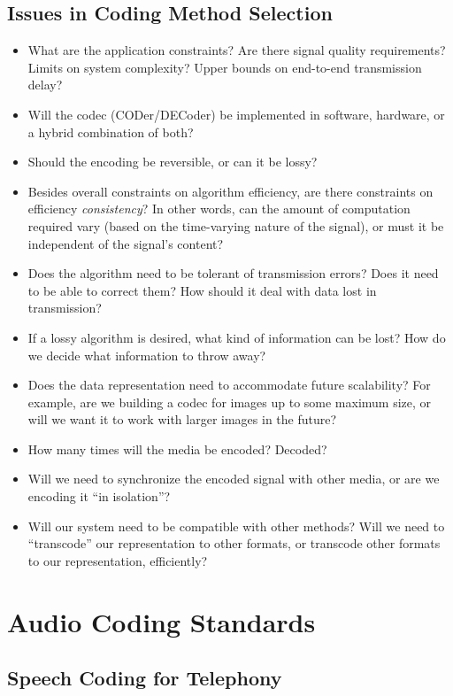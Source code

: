\subsection{Issues in Coding Method Selection}
\begin{itemize}
\item What are the application constraints? Are there signal quality
requirements? Limits on system complexity? Upper bounds on end-to-end
transmission delay?
\item Will the codec (CODer/DECoder) be implemented in software,
hardware, or a hybrid combination of both?
\item Should the encoding be reversible, or can it be lossy?
\item Besides overall constraints on algorithm efficiency, are there
constraints on efficiency \emph{consistency}? In other words, can the
amount of computation required vary (based on the time-varying nature
of the signal), or must it be independent of the signal's content?
\item Does the algorithm need to be tolerant of transmission errors?
Does it need to be able to correct them? How should it deal with data
lost in transmission?
\item If a lossy algorithm is desired, what kind of information can be 
lost? How do we decide what information to throw away?
\item Does the data representation need to accommodate future
scalability?  For example, are we building a codec for images up to
some maximum size, or will we want it to work with larger images in
the future?
\item How many times will the media be encoded? Decoded?
\item Will we need to synchronize the encoded signal with other media, 
or are we encoding it ``in isolation''?
\item Will our system need to be compatible with other methods?  Will
we need to ``transcode'' our representation to other formats, or
transcode other formats to our representation, efficiently?
\end{itemize}

\section{Audio Coding Standards}

\subsection{Speech Coding for Telephony}

